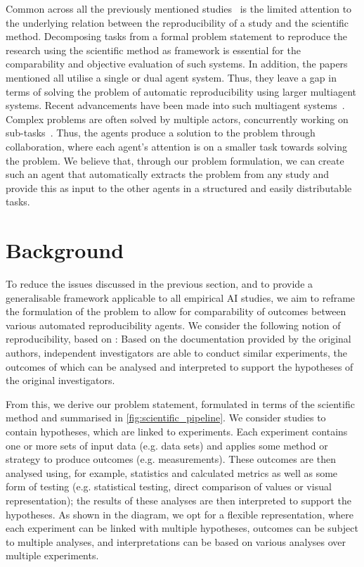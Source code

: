 \documentclass[letterpaper]{article} %
\begin{document}
Common across all the previously mentioned studies~\cite{starace_paperbench_2025, hu2025repro, xiang_scireplicate-bench_2025, zhao_autoreproduce_2025} is the limited attention to the underlying relation between the reproducibility of a study and the scientific method. Decomposing tasks from a formal problem statement to reproduce the research using the scientific method as framework is essential for the comparability and objective evaluation of such systems. In addition, the papers mentioned all utilise a single or dual agent system. Thus, they leave a gap in terms of solving the problem of automatic reproducibility using larger multiagent systems. Recent advancements have been made into such multiagent systems~\cite{chen_autoagents_2024}. Complex problems are often solved by multiple actors, concurrently working on sub-tasks~\cite{ozturk_multiagent_2010}. Thus, the agents produce a solution to the problem through collaboration, where each agent's attention is on a smaller task towards solving the problem. We believe that, through our problem formulation, we can create such an agent that automatically extracts the problem from any study and provide this as input to the other agents in a structured and easily distributable tasks.

\section{Background}
To reduce the issues discussed in the previous section, and to provide a generalisable framework applicable to all empirical AI studies, we aim to reframe the formulation of the problem to allow for comparability of outcomes between various automated reproducibility agents.
We consider the following notion of reproducibility, based on \citet{gundersen2021fundamental}: 
Based on the documentation provided by the original authors, independent investigators are able to conduct similar experiments, the outcomes of which can be analysed and interpreted to support the hypotheses of the original investigators. 

From this, we derive our problem statement, formulated in terms of the scientific method and summarised in \autoref{fig:scientific_pipeline}. 
We consider studies to contain hypotheses, which are linked to experiments. 
Each experiment contains one or more sets of input data (e.g.{} data sets) and applies some method or strategy to produce outcomes (e.g. measurements). 
These outcomes are then analysed using, for example, statistics and calculated metrics as well as some form of testing (e.g. statistical testing, direct comparison of values or visual representation); the results of these analyses are then interpreted to support the hypotheses. 
As shown in the diagram, we opt for a flexible representation, where each experiment can be linked with multiple hypotheses, outcomes can be subject to multiple analyses, and interpretations can be based on various analyses over multiple experiments. 
\end{document}
